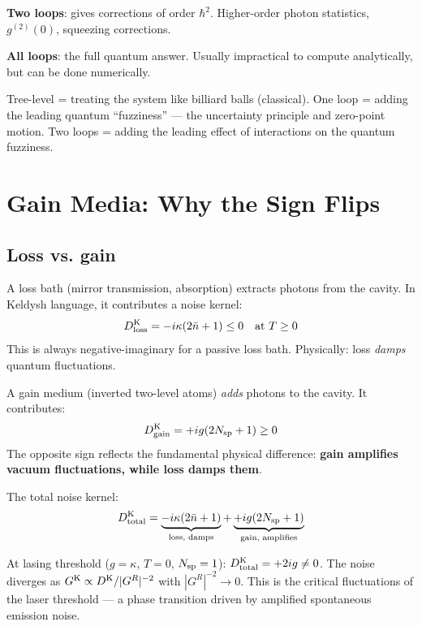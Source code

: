 \documentclass[12pt]{article}
\newcommand{\Keldysh}{{\rm K}}
\providecommand{\Keldysh}{{\rm K}}
\begin{document}
\textbf{Two loops}: gives corrections of order $\hbar^2$.
Higher-order photon statistics, $g^{(2)}(0)$, squeezing corrections.

\textbf{All loops}: the full quantum answer.  Usually impractical
to compute analytically, but can be done numerically.

\begin{analogy}
Tree-level = treating the system like billiard balls (classical).
One loop = adding the leading quantum ``fuzziness'' --- the
uncertainty principle and zero-point motion.
Two loops = adding the leading effect of interactions on the
quantum fuzziness.
\end{analogy}

\section{Gain Media: Why the Sign Flips}

\subsection{Loss vs. gain}

A loss bath (mirror transmission, absorption) extracts photons
from the cavity. In Keldysh language, it contributes a noise kernel:
\begin{equation}
  D^\Keldysh_{\rm loss} = -i\kappa(2\bar{n}+1) \leq 0
  \quad\text{at } T\geq 0
\end{equation}
This is always negative-imaginary for a passive loss bath.
Physically: loss \emph{damps} quantum fluctuations.

A gain medium (inverted two-level atoms) \emph{adds} photons to
the cavity. It contributes:
\begin{equation}
  D^\Keldysh_{\rm gain} = +ig(2N_{\rm sp}+1) \geq 0
\end{equation}
The opposite sign reflects the fundamental physical difference:
\textbf{gain amplifies vacuum fluctuations, while loss damps them}.

The total noise kernel:
\begin{equation}
  D^\Keldysh_{\rm total} =
  \underbrace{-i\kappa(2\bar{n}+1)}_{\text{loss, damps}} +
  \underbrace{+ig(2N_{\rm sp}+1)}_{\text{gain, amplifies}}
\end{equation}

At lasing threshold ($g=\kappa$, $T=0$, $N_{\rm sp}=1$):
$D^\Keldysh_{\rm total} = +2ig \neq 0$. The noise diverges as
$G^\Keldysh \propto D^\Keldysh/|G^R|^{-2}$ with $|G^R|^{-2}\to 0$.
This is the critical fluctuations of the laser threshold --- a
phase transition driven by amplified spontaneous emission noise.
\end{document}
